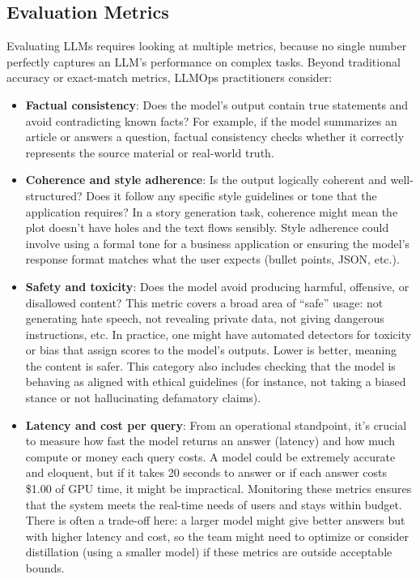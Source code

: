 \subsection{Evaluation Metrics}
Evaluating LLMs requires looking at multiple metrics, because no single number perfectly captures an LLM’s performance on complex tasks. Beyond traditional accuracy or exact-match metrics, LLMOps practitioners consider: \begin{itemize}
\item \textbf{Factual consistency}: Does the model’s output contain true statements and avoid contradicting known facts? For example, if the model summarizes an article or answers a question, factual consistency checks whether it correctly represents the source material or real-world truth.
\item \textbf{Coherence and style adherence}: Is the output logically coherent and well-structured? Does it follow any specific style guidelines or tone that the application requires? In a story generation task, coherence might mean the plot doesn’t have holes and the text flows sensibly. Style adherence could involve using a formal tone for a business application or ensuring the model’s response format matches what the user expects (bullet points, JSON, etc.).
\item \textbf{Safety and toxicity}: Does the model avoid producing harmful, offensive, or disallowed content? This metric covers a broad area of “safe” usage: not generating hate speech, not revealing private data, not giving dangerous instructions, etc. In practice, one might have automated detectors for toxicity or bias that assign scores to the model’s outputs. Lower is better, meaning the content is safer. This category also includes checking that the model is behaving as aligned with ethical guidelines (for instance, not taking a biased stance or not hallucinating defamatory claims).
\item \textbf{Latency and cost per query}: From an operational standpoint, it’s crucial to measure how fast the model returns an answer (latency) and how much compute or money each query costs. A model could be extremely accurate and eloquent, but if it takes 20 seconds to answer or if each answer costs \$1.00 of GPU time, it might be impractical. Monitoring these metrics ensures that the system meets the real-time needs of users and stays within budget. There is often a trade-off here: a larger model might give better answers but with higher latency and cost, so the team might need to optimize or consider distillation (using a smaller model) if these metrics are outside acceptable bounds.
\end{itemize}

